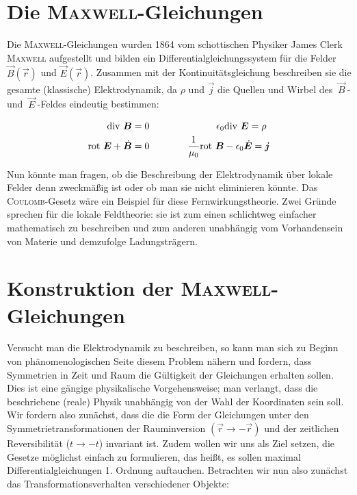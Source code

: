 \section{Die \textsc{Maxwell}-Gleichungen}
Die \textsc{Maxwell}-Gleichungen wurden 1864 vom schottischen Physiker James Clerk \textsc{Maxwell} aufgestellt und bilden ein Differentialgleichungssystem für die Felder  $\vec{B}(\vec{r})$ und $\vec{E}(\vec{r})$. Zusammen mit der Kontinuitätsgleichung beschreiben sie die gesamte (klassische) Elektrodynamik, da $\rho$ und $\vec{j}$ die Quellen und Wirbel des $ \ \vec{B} \ $- und $ \ \vec{E} \ $-Feldes eindeutig bestimmen:

\begin{align*}
\text{div } \bm{B} &= 0 \qquad\qquad\qquad\quad \epsilon_0\text{div } \bm{E} = \rho \\
\text{rot } \bm{E} + \dot{\bm{B}} &= 0 \qquad\qquad \frac{1}{\mu_0}\text{rot} \ \bm{B} - \epsilon_0\dot{\bm{E}} = \bm{j}
\end{align*}


Nun könnte man fragen, ob die  Beschreibung der Elektrodynamik über lokale Felder denn zweckmäßig ist oder ob man sie nicht eliminieren könnte. Das \textsc{Coulomb}-Gesetz wäre ein Beispiel für diese Fernwirkungstheorie. Zwei Gründe sprechen für die lokale Feldtheorie: sie ist zum einen schlichtweg einfacher mathematisch zu beschreiben und zum anderen unabhängig vom Vorhandensein von Materie und demzufolge Ladungsträgern.

\section{Konstruktion der \textsc{Maxwell}-Gleichungen}
Versucht man die Elektrodynamik zu beschreiben, so kann man sich zu Beginn von phänomenologischen Seite diesem Problem nähern und fordern, dass Symmetrien in Zeit und Raum die Gültigkeit der Gleichungen erhalten sollen. Dies ist eine gängige physikalische Vorgehensweise; man verlangt, dass die beschriebene (reale) Physik unabhängig von der Wahl der Koordinaten sein soll.
Wir fordern also zunächst, dass die die Form der Gleichungen unter den Symmetrietransformationen der Rauminversion $(\vec{r}\rightarrow-\vec{r})$ und der zeitlichen Reversibilität ($t\rightarrow-t$) invariant ist. Zudem wollen wir uns als Ziel setzen, die Gesetze möglichst einfach zu formulieren, das heißt, es sollen maximal Differentialgleichungen 1. Ordnung auftauchen.
Betrachten wir nun also zunächst das Transformationsverhalten verschiedener Objekte:\ \\
\ \\


